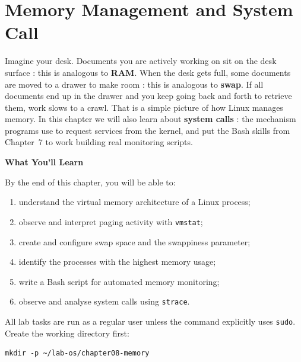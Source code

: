 \chapter{Memory Management and System Call}
\label{ch:memory-and-syscalls}


Imagine your desk. Documents you are actively working on sit on the desk surface
: this is analogous to \textbf{RAM}. When the desk gets full, some documents
are moved to a drawer to make room : this is analogous to \textbf{swap}. If
all documents end up in the drawer and you keep going back and forth to retrieve
them, work slows to a crawl. That is a simple picture of how Linux manages memory.
In this chapter we will also learn about \textbf{system calls} : the mechanism
programs use to request services from the kernel, and put the Bash skills from
Chapter~7 to work building real monitoring scripts.

\textbf{What You'll Learn}

By the end of this chapter, you will be able to:

\begin{enumerate}
    \item understand the virtual memory architecture of a Linux process;
    \item observe and interpret paging activity with \texttt{vmstat};
    \item create and configure swap space and the swappiness parameter;
    \item identify the processes with the highest memory usage;
    \item write a Bash script for automated memory monitoring;
    \item observe and analyse system calls using \texttt{strace}.
\end{enumerate}

\begin{notebox}
All lab tasks are run as a regular user unless the command explicitly uses
\texttt{sudo}. Create the working directory first:
\begin{lstlisting}
mkdir -p ~/lab-os/chapter08-memory
\end{lstlisting}
\end{notebox}

